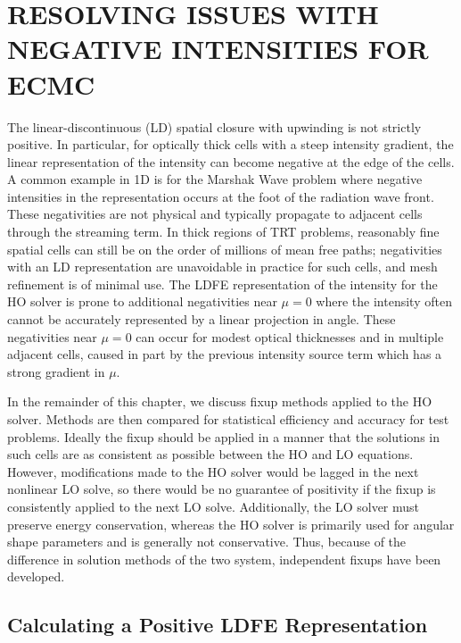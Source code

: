 

\chapter{\uppercase{Resolving Issues with Negative Intensities for ECMC}}
\label{chp:negativities}

The linear-discontinuous (LD) spatial closure with upwinding is not strictly positive.  In
particular, for optically thick cells with a steep intensity gradient, the linear
representation of the intensity can become negative at the edge of the cells.  A common
example in 1D is for the Marshak Wave problem where negative intensities in the
representation occurs at the foot of the radiation wave front. These negativities are not
physical and typically propagate to adjacent cells through the streaming term. In thick regions of TRT problems,
reasonably fine spatial cells can still be on the order of millions of mean free paths;
negativities with an LD representation are unavoidable in practice for such cells, and
mesh refinement is of minimal use.  The LDFE representation of the intensity for the HO solver is prone to additional negativities near
$\mu=0$ where the intensity often cannot be accurately represented by a linear projection in
angle.  These negativities near $\mu=0$ can occur for modest optical thicknesses and in
multiple adjacent cells, caused in part by the previous intensity source term which has a
strong gradient in $\mu$. 

In the remainder of this chapter, we discuss fixup methods applied to the HO solver.
Methods are then compared for statistical efficiency and accuracy for test problems.
Ideally the fixup should be applied in a manner that the solutions in such cells are as consistent as possible between the HO
and LO equations.  However, modifications made to the HO solver would be lagged in the
next nonlinear LO solve, so there would be no guarantee of positivity if the fixup is
consistently applied to the next LO solve. Additionally, the LO solver must preserve
energy conservation, whereas the HO solver is primarily used for angular shape parameters
and is generally not conservative. Thus, because of the difference in solution
methods of the two system, independent fixups have been developed.  

\section{Calculating a Positive LDFE Representation}
\label{sec:pos_ldfe}

